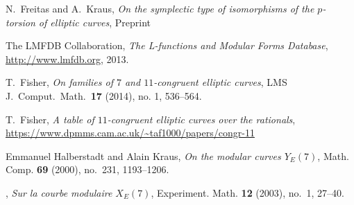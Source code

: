 \documentclass[12pt]{amsart}
\numberwithin{equation}{section}
\theoremstyle{definition}
\theoremstyle{remark}
\begin{document}
 
\begin{thebibliography}{999}


 N.\ Freitas and A.\ Kraus,
{\em On the symplectic type of isomorphisms of the $p$-torsion of elliptic curves}, Preprint

 The {LMFDB Collaboration},
{\em The L-functions and Modular Forms Database}, \\
\url{http://www.lmfdb.org}, 2013.

 T.\ Fisher,
{\em On families of $7$ and $11$-congruent elliptic curves}, 
LMS J.\ Comput.\ Math.\ {\bf 17} (2014), no. 1, 536--564.

 T.\ Fisher,
{\em A table of $11$-congruent elliptic curves over the rationals}, \\
\url{https://www.dpmms.cam.ac.uk/~taf1000/papers/congr-11}

Emmanuel Halberstadt and Alain Kraus, \emph{On the modular curves {$Y_E(7)$}},
  Math. Comp. \textbf{69} (2000), no.~231, 1193--1206. 

\bysame, \emph{Sur la courbe modulaire {$X_E(7)$}}, Experiment. Math.
  \textbf{12} (2003), no.~1, 27--40. 


\begin{comment}
 
\bibitem{AnniSiksek} S.\ Anni and S.\ Siksek,
{\em Modular elliptic curves over real abelian fields and the generalized {F}ermat equation $x^{2\ell} + y^{2m}=z^p$}, Algebra \& Number Theory {\bf 10} (2016), no.6, 1147--1172


\bibitem{BennetSkinner} M.\ A.\ Bennett and C.\ M.\ Skinner,
{\em Ternary Diophantine equations via Galois representations and modular forms}, Canad.\ J.\ Math.\ {\bf 56} (2004), no. 1, 23--54.
 


\bibitem{programs} N. Billerey, I. Chen, L. Demb\'el\'e, L. Dieulefait, and N. Freitas, 
{\em Supporting {{\tt Magma}} program files for this paper},
\url{http://math.univ-bpclermont.fr/~billerey/Research/BCDDF/}


\end{comment}
\end{thebibliography}
\end{document}
